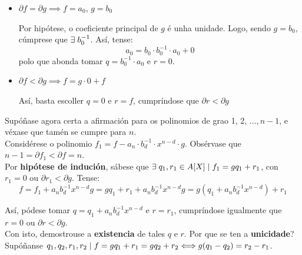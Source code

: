 \documentclass[twoside]{report}
\theoremstyle{mystyle}
\begin{document}
\begin{itemize}
    \item $\partial f = \partial g \implies f = a_{0}$, $g = b_{0}$
    
    Por hipótese, o coeficiente principal de $g$ é unha unidade. Logo, sendo $g = b_{0}$, cúmprese que $\exists \hspace{1mm} b_{0}^{-1}$. Así, tense:
    $$a_{0} = b_{0} \cdot b_{0}^{-1} \cdot a_{0} + 0$$
    polo que abonda tomar $q = b_{0}^{-1} \cdot a_{0}$ e $r = 0$.
    
    \item $\partial f < \partial g \implies f = g \cdot 0 + f$
    
    Así, basta escoller $q = 0$ e $r = f$, cumpríndose que $\partial r < \partial g$
    
\end{itemize}

\noindent Supóñase agora certa a afirmación para os polinomios de grao 1, 2, $\ldots, n-1$, e véxase que tamén se cumpre para $n$.\\

\noindent Considérese o polinomio $f_{1} = f - a_{n} \cdot b_{d}^{-1} \cdot x^{n-d} \cdot g$. Obsérvase que $n-1 = \partial f_{1} < \partial f = n$.\\

\noindent Por \textbf{hipótese de indución}, sábese que $\exists \hspace{1mm} q_{1}, r_{1} \in A[X] \hspace{1mm} | \hspace{1mm} f_{1} = gq_{1} + r_{1}$, con $r_{1} = 0$ ou $\partial r_{1} < \partial g$. Tense:
$$f = f_{1} + a_{n}b_{d}^{-1}x^{n-d}g = gq_{1} + r_{1} + a_{n}b_{d}^{-1}x^{n-d}g = g(q_{1} + a_{n}b_{d}^{-1}x^{n-d}) + r_{1}$$

\noindent Así, pódese tomar $q = q_{1} + a_{n}b_{d}^{-1}x^{n-d}$ e $r = r_{1}$, cumpríndose igualmente que $r = 0$ ou $\partial r < \partial g$.\\

\noindent Con isto, demostrouse a \textbf{existencia} de tales $q$ e $r$. Por que se ten a \textbf{unicidade}?\\

\noindent Supóñanse $q_{1}, q_{2}, r_{1}, r_{2} \hspace{1mm} | \hspace{1mm} f = gq_{1} + r_{1} = gq_{2} + r_{2} \Longleftrightarrow g(q_{1} - q_{2}) = r_{2} - r_{1}$. \\
\end{document}
